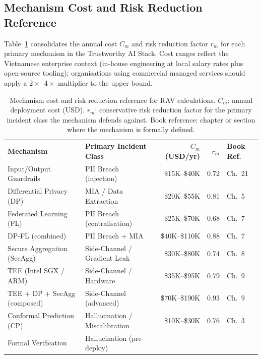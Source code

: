 \subsection{Mechanism Cost and Risk Reduction Reference}
\label{subsec:mechanism-reference}

Table~\ref{tab:mechanism-rav-reference} consolidates the
annual cost $C_m$ and risk reduction factor $r_m$ for each
primary mechanism in the Trustworthy AI Stack.
Cost ranges reflect the Vietnamese enterprise context
(in-house engineering at local salary rates plus open-source
tooling); organisations using commercial managed services
should apply a $2\times$--$4\times$ multiplier to the
upper bound.

\begin{table}[ht]
\centering
\caption{Mechanism cost and risk reduction reference for RAV
  calculations.
  $C_m$: annual deployment cost (USD).
  $r_m$: conservative risk reduction factor for the primary
  incident class the mechanism defends against.
  Book reference: chapter or section where the mechanism is
  formally defined.}
\label{tab:mechanism-rav-reference}
\small
\begin{tabular}{p{3.0cm}p{2.6cm}rrp{1.8cm}}
\hline\noalign{\smallskip}
\textbf{Mechanism}
  & \textbf{Primary Incident Class}
  & \textbf{$C_m$ (USD/yr)}
  & \textbf{$r_m$}
  & \textbf{Book Ref.} \\
\noalign{\smallskip}\svhline\noalign{\smallskip}
Input/Output Guardrails
  & PII Breach (injection)
  & \$15K--\$40K & 0.72
  & Ch.~21 \\[3pt]
Differential Privacy (DP)
  & MIA / Data Extraction
  & \$20K--\$55K & 0.81
  & Ch.~5 \\[3pt]
Federated Learning (FL)
  & PII Breach (centralisation)
  & \$25K--\$70K & 0.68
  & Ch.~7 \\[3pt]
DP-FL (combined)
  & PII Breach + MIA
  & \$40K--\$110K & 0.88
  & Ch.~7 \\[3pt]
Secure Aggregation (SecAgg)
  & Side-Channel / Gradient Leak
  & \$30K--\$80K & 0.74
  & Ch.~8 \\[3pt]
TEE (Intel SGX / ARM)
  & Side-Channel / Hardware
  & \$35K--\$95K & 0.79
  & Ch.~9 \\[3pt]
TEE + DP + SecAgg (composed)
  & Side-Channel (advanced)
  & \$70K--\$190K & 0.93
  & Ch.~9 \\[3pt]
Conformal Prediction (CP)
  & Hallucination / Miscalibration
  & \$10K--\$30K & 0.76
  & Ch.~3 \\[3pt]
Formal Verification
  & Hallucination (pre-deploy)

\end{tabular}
\end{table}
